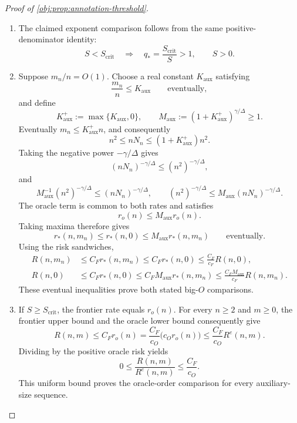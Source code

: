 \begin{proof}[Proof of \cref{obj:prop:annotation-threshold}]
\begin{enumerate}
\item
The claimed exponent comparison follows from the same positive-denominator identity:
\[
S<S_{\mathrm{crit}}
\quad\Longrightarrow\quad
q_*=\frac{S_{\mathrm{crit}}}{S}>1,
\qquad S>0.
\]

\item
Suppose \(m_n/n=O(1)\). Choose a real constant \(K_{\mathrm{aux}}\) satisfying
\[
\frac{m_n}{n}\le K_{\mathrm{aux}}
\qquad\text{eventually},
\]
and define
\[
K_{\mathrm{aux}}^+:=\max\{K_{\mathrm{aux}},0\},
\qquad
M_{\mathrm{aux}}
:=(1+K_{\mathrm{aux}}^+)^{\gamma/\Delta}\ge1.
\]
Eventually \(m_n\le K_{\mathrm{aux}}^+n\), and consequently
\[
n^2\le nN_n\le(1+K_{\mathrm{aux}}^+)n^2.
\]
Taking the negative power \(-\gamma/\Delta\) gives
\[
(nN_n)^{-\gamma/\Delta}\le(n^2)^{-\gamma/\Delta},
\]
and
\[
M_{\mathrm{aux}}^{-1}(n^2)^{-\gamma/\Delta}
\le(nN_n)^{-\gamma/\Delta},
\qquad
(n^2)^{-\gamma/\Delta}
\le M_{\mathrm{aux}}(nN_n)^{-\gamma/\Delta}.
\]
The oracle term is common to both rates and satisfies
\[
r_o(n)\le M_{\mathrm{aux}}r_o(n).
\]
Taking maxima therefore gives
\[
r_*(n,m_n)\le r_*(n,0)
\le M_{\mathrm{aux}}r_*(n,m_n)
\qquad\text{eventually}.
\]
Using the risk sandwiches,
\[
\begin{aligned}
R(n,m_n)
&\le C_F r_*(n,m_n)
\le C_F r_*(n,0)
\le \frac{C_F}{c_F}R(n,0),\\
R(n,0)
&\le C_F r_*(n,0)
\le C_F M_{\mathrm{aux}}r_*(n,m_n)
\le \frac{C_F M_{\mathrm{aux}}}{c_F}R(n,m_n).
\end{aligned}
\]
These eventual inequalities prove both stated big-\(O\) comparisons.

\item
If \(S\ge S_{\mathrm{crit}}\), the frontier rate equals \(r_o(n)\). For every \(n\ge2\) and \(m\ge0\), the frontier upper bound and the oracle lower bound consequently give
\[
R(n,m)
\le C_F r_o(n)
=\frac{C_F}{c_O}\bigl(c_O r_o(n)\bigr)
\le\frac{C_F}{c_O}R^e(n,m).
\]
Dividing by the positive oracle risk yields
\[
0\le\frac{R(n,m)}{R^e(n,m)}
\le\frac{C_F}{c_O}.
\]
This uniform bound proves the oracle-order comparison for every auxiliary-size sequence.


\end{enumerate}
\end{proof}
